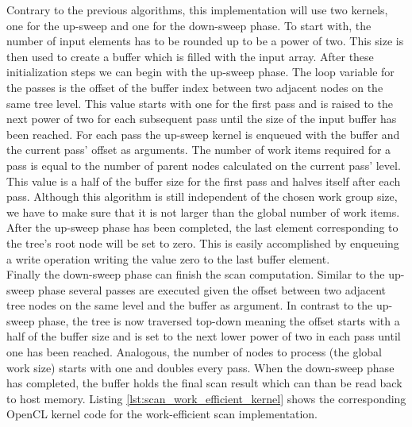 Contrary to the previous algorithms, this implementation will use two kernels, one for the up-sweep and one for the down-sweep phase. 
To start with, the number of input elements has to be rounded up to be a power of two. This size is then used to create a buffer which is filled with the input array.
After these initialization steps we can begin with the up-sweep phase. The loop variable for the passes is the offset of the buffer index between two adjacent nodes on the same tree level. This value starts with one for the first pass and is raised to the next power of two for each subsequent pass until the size of the input buffer has been reached. For each pass the up-sweep kernel is enqueued with the buffer and the current pass' offset as arguments. The number of work items required for a pass is equal to the number of parent nodes calculated on the current pass' level. This value is a half of the buffer size for the first pass and halves itself after each pass. Although this algorithm is still independent of the chosen work group size, we have to make sure that it is not larger than the global number of work items. \\
After the up-sweep phase has been completed, the last element corresponding to the tree's root node will be set to zero. This is easily accomplished by enqueuing a write operation writing the value zero to the last buffer element. \\
Finally the down-sweep phase can finish the scan computation. Similar to the up-sweep phase several passes are executed given the offset between two adjacent tree nodes on the same level and the buffer as argument. In contrast to the up-sweep phase, the tree is now traversed top-down meaning the offset starts with a half of the buffer size and is set to the next lower power of two in each pass until one has been reached. Analogous, the number of nodes to process (the global work size) starts with one and doubles every pass.
When the down-sweep phase has completed, the buffer holds the final scan result which can than be read back to host memory.
Listing \ref{lst:scan_work_efficient_kernel} shows the corresponding OpenCL kernel code for the work-efficient scan implementation.



